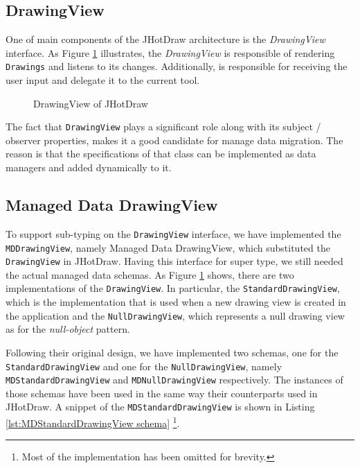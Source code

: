 \subsection{DrawingView}
One of main components of the JHotDraw architecture is the \textit{DrawingView} interface.
As Figure \ref{fig:JHotDraw_DrawingView} illustrates, the \textit{DrawingView} is responsible of rendering \texttt{Drawings} and listens to its changes.
Additionally, is responsible for receiving the user input and delegate it to the current tool.

\begin{figure}[H]
	\centering
  	\caption{DrawingView of JHotDraw}
  	\label{fig:JHotDraw_DrawingView}
\end{figure}

The fact that \texttt{DrawingView} plays a significant role along with its subject / observer properties, makes it a good candidate for manage data migration.
The reason is that the specifications of that class can be implemented as data managers and added dynamically to it.

\subsection{Managed Data DrawingView}
To support sub-typing on the \texttt{DrawingView} interface, we have implemented the \texttt{MDDrawingView}, namely Managed Data DrawingView, which substituted the \texttt{DrawingView} in JHotDraw.
Having this interface for super type, we still needed the actual managed data schemas.
As Figure \ref{fig:JHotDraw_DrawingView} shows, there are two implementations of the \texttt{DrawingView}.
In particular, the \texttt{StandardDrawingView}, which is the implementation that is used when a new drawing view is created in the application and the \texttt{NullDrawingView}, which represents a null drawing view as for the \textit{null-object} pattern.

Following their original design, we have implemented two schemas, one for the \texttt{StandardDrawingView} and one for the \texttt{NullDrawingView}, namely \texttt{MDStandardDrawingView} and \texttt{MDNullDrawingView} respectively.
The instances of those schemas have been used in the same way their counterparts used in JHotDraw.
A snippet of the \texttt{MDStandardDrawingView} is shown in Listing \ref{lst:MDStandardDrawingView schema} \footnote{Most of the implementation has been omitted for brevity.}.

